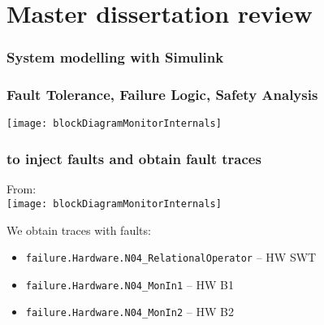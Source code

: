 \section{Master dissertation review}

\begin{frame}
\frametitle{System modelling with Simulink}
\end{frame}

\begin{frame}
\frametitle{Fault Tolerance, Failure Logic, Safety Analysis}
\texttt{[image: blockDiagramMonitorInternals]}\par
{}
\end{frame}

\begin{frame}[fragile]
\frametitle{\CSPM to inject faults and obtain fault traces}
From:\\
\texttt{[image: blockDiagramMonitorInternals]}\par

We obtain traces with faults:
{\tiny
\begin{itemize}
  \item \verb|failure.Hardware.N04_RelationalOperator| -- HW SWT 
  \item \verb|failure.Hardware.N04_MonIn1| -- HW B1 
  \item \verb|failure.Hardware.N04_MonIn2| -- HW B2 
\end{itemize}
}

\end{frame}

